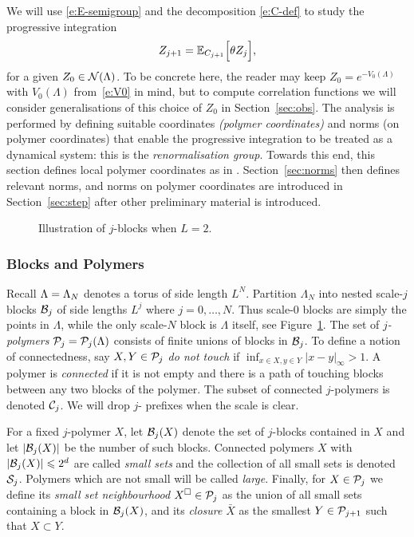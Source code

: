 \documentclass[11pt]{amsart}
\numberwithin{equation}{section}
\numberwithin{theorem}{section}
\newcommand{\1}{{\bf 1}}
\begin{document}
We will use \eqref{e:E-semigroup} and the
decomposition \eqref{e:C-def} to study the progressive integration
\begin{equation} \label{e:EZj}
  Z_{j+1} = \mathbb{E}_{C_{j+1}} \Bigl[{\theta Z_j }\Bigr], 
\end{equation}
for a given $Z_{0}\in \mathcal N(\Lambda)$. To be concrete here, the reader
may keep $Z_0=e^{-V_0(\Lambda)}$ with $V_{0}(\Lambda)$
from~\eqref{e:V0} in mind, but to compute correlation functions we
will consider generalisations of this choice of $Z_{0}$ in
Section~\ref{sec:obs}.  The analysis is performed by defining suitable
coordinates \emph{(polymer coordinates)} and norms (on
polymer coordinates) that enable the progressive integration to be
treated as a dynamical system: this is the \emph{renormalisation
group}. Towards this end, this section defines local polymer coordinates
as in \cite{MR2523458,MR3332942}. Section~\ref{sec:norms}
then defines relevant norms, and norms on polymer coordinates are
introduced in Section~\ref{sec:step} after other preliminary
material is introduced.

\begin{figure}
  
  \caption{Illustration of $j$-blocks when $L=2$.\label{fig:blocks}}
\end{figure}

\subsubsection{Blocks and Polymers}
Recall $\Lambda=\Lambda_{N}$ denotes a torus of side length
$L^{N}$. Partition $\Lambda_N$ into nested scale-$j$ blocks $\mathcal B_j$ of
side lengths $L^j$ where $j=0,\dots, N$.  Thus scale-$0$ blocks are
simply the points in $\Lambda$, while 
the only scale-$N$ block is $\Lambda$ itself, see
Figure~\ref{fig:blocks}.  The set of \emph{$j$-polymers}
$\mathcal P_j=\mathcal P_j(\Lambda)$ consists of finite unions of blocks in
$\mathcal B_j$. To define a notion of connectedness, say $X,Y \in \mathcal P_j$
\emph{do not touch} if $\inf_{x\in X,y\in Y} |x-y|_\infty > 1$.  A
polymer is \emph{connected} if it is not empty and there is a path of
touching blocks between any two blocks of the polymer.  The subset of
connected $j$-polymers is denoted $\mathcal C_j$.  We will drop $j$- prefixes
when the scale is clear.


For a fixed $j$-polymer $X$, let $\mathcal B_j(X)$ denote the set of $j$-blocks
contained in $X$ and let $|\mathcal B_j(X)|$ be the number of such blocks.
Connected polymers $X$ with $|\mathcal B_j(X)| \leqslant 2^d$ are called
\emph{small sets} and the collection of all small sets is denoted
$\mathcal S_j$. Polymers which are not small will be called \emph{large}.
Finally, for $X \in \mathcal P_j$ we define its \emph{small set
neighbourhood} $X^\square \in\mathcal P_j$ as the union of all small sets
containing a block in $\mathcal B_j(X)$, and its \emph{closure}
$\bar{X}$ as the smallest $Y\in\mathcal P_{j+1}$ such that $X\subset Y$.
\end{document}
